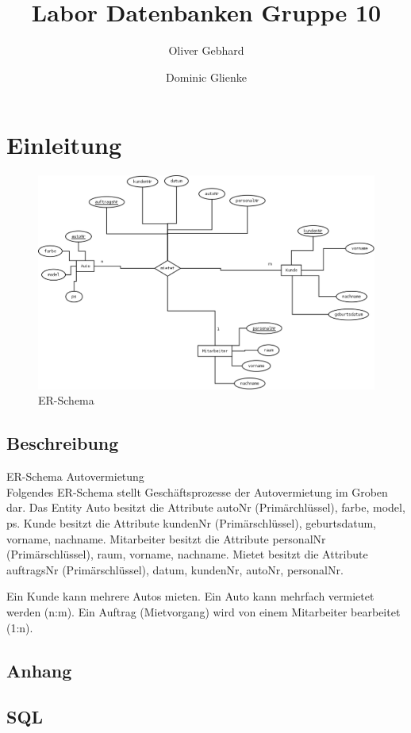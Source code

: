 \documentclass[a4paper,12pt]{article}
\begin{document}
\title{Labor Datenbanken Gruppe 10}
\author{ Oliver Gebhard \and Dominic Glienke }
\maketitle

\newpage
\tableofcontents
\newpage
\setcounter{tocdepth}{2}


\section{Einleitung}

\begin{figure}[h]
    \centering
    \includegraphics[scale=0.24]{ER_Schema_Autovermietung.png}
    \caption{ER-Schema}
    \label{Autovermietung}
\end{figure}

\newpage

\subsection{Beschreibung}

ER-Schema Autovermietung \\

Folgendes ER-Schema stellt Geschäftsprozesse der Autovermietung im Groben dar. 
Das Entity 	Auto besitzt die Attribute autoNr (Primärchlüssel), farbe, model, ps.
		Kunde besitzt die Attribute kundenNr (Primärschlüssel), geburtsdatum, vorname, nachname.
Mitarbeiter besitzt die Attribute personalNr (Primärschlüssel), raum, vorname, nachname.
Mietet besitzt die Attribute auftragsNr (Primärschlüssel), datum, kundenNr, autoNr, personalNr.

Ein Kunde kann mehrere Autos mieten.  Ein Auto kann mehrfach vermietet werden (n:m).
Ein Auftrag (Mietvorgang) wird von einem Mitarbeiter bearbeitet (1:n).

\newpage
\begin{appendix}
\section{Anhang}

\subsection{SQL}



\end{appendix}
\end{document}

